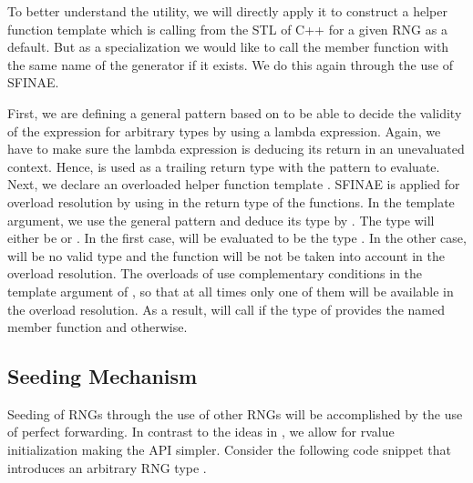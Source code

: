 \documentclass{stdlocal}
\begin{document}
    To better understand the utility, we will directly apply it to construct a helper function template  which is calling  from the STL of C++ for a given RNG as a default.
    But as a specialization we would like to call the member function with the same name of the generator if it exists.
    We do this again through the use of SFINAE.

    First, we are defining a general pattern  based on  to be able to decide the validity of the expression  for arbitrary types by using a lambda expression.
    Again, we have to make sure the lambda expression is deducing its return in an unevaluated context.
    Hence,  is used as a trailing return type with the pattern to evaluate.
    Next, we declare an overloaded helper function template .
    SFINAE is applied for overload resolution by using  in the return type of the functions.
    In the template argument, we use the general pattern  and deduce its type by .
    The type will either be  or .
    In the first case,  will be evaluated to be the type .
    In the other case,  will be no valid type and the function will be not be taken into account in the overload resolution.
    The overloads of  use complementary conditions in the template argument of , so that at all times only one of them will be available in the overload resolution.
    As a result,  will call  if the type of  provides the named member function and  otherwise.

  \subsection{Seeding Mechanism} %
  \label{sub:seeding}
    Seeding of RNGs through the use of other RNGs will be accomplished by the use of perfect forwarding.
    In contrast to the ideas in \textcite{cpp-std-seeding}, we allow for rvalue initialization making the API simpler.
    Consider the following code snippet that introduces an arbitrary RNG type .
\end{document}
